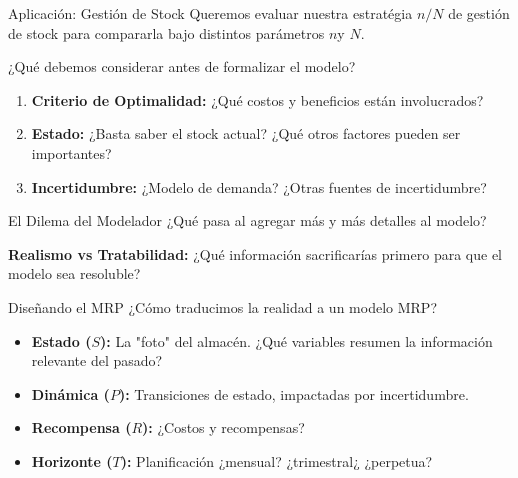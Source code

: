 \documentclass[xcolor=dvipsnames]{beamer}
\begin{document}
\begin{frame}{Aplicaci\'on: Gestión de Stock}
Queremos evaluar nuestra estrat\'egia $n/N$ de gesti\'on de stock para compararla bajo distintos par\'ametros $n$y $N$.

¿Qué debemos considerar antes de formalizar el modelo?

\begin{enumerate}
    \item \textbf{Criterio de Optimalidad:} ¿Qu\'e costos y beneficios est\'an involucrados?
    \item \textbf{Estado:} ¿Basta saber el stock actual? ¿Qu\'e otros factores pueden ser importantes?
    \item \textbf{Incertidumbre:} ¿Modelo de demanda? ¿Otras fuentes de incertidumbre?
\end{enumerate}

\vspace{0.4cm}
\begin{block}{El Dilema del Modelador}
¿Qu\'e pasa al agregar m\'as y m\'as detalles al modelo? 

\textbf{Realismo vs Tratabilidad:} ¿Qué información sacrificarías primero para que el modelo sea resoluble?
\end{block}
\end{frame}

\begin{frame}{Diseñando el MRP}
¿Cómo traducimos la realidad a un modelo MRP?

\begin{itemize}
    \item \textbf{Estado ($S$):} La "foto" del almacén. ¿Qué variables resumen la informaci\'on relevante del pasado?
    \item \textbf{Dinámica ($P$):} Transiciones de estado, impactadas por incertidumbre.
    \item \textbf{Recompensa ($R$):} ¿Costos y recompensas?
    \item \textbf{Horizonte ($T$):}  Planificación ¿mensual? ¿trimestral¿  ¿perpetua?
\end{itemize}

\end{frame}
\end{document}
